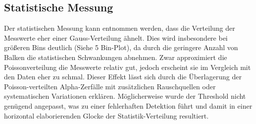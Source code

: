 \subsection{Statistische Messung}
Der statistischen Messung kann entnommen werden, dass die Verteilung der
Messwerte eher einer Gauss-Verteilung ähnelt. Dies wird insbesondere bei
größeren Bins deutlich (Siehe 5 Bin-Plot), da durch die geringere Anzahl 
von Balken die statistischen Schwankungen abnehmen. Zwar approximiert die 
Poissonverteilung die Messwerte relativ gut, jedoch erscheint sie im Vergleich 
mit den Daten eher zu schmal. Dieser Effekt lässt sich durch die Überlagerung
der Poisson-verteilten Alpha-Zerfälle mit zusätzlichen Rauschquellen oder
systematischen Variationen erklären. Möglicherweise wurde der Threshold nicht 
genügend angepasst, was zu einer fehlerhaften Detektion führt und damit in einer 
horizontal elaborierenden Glocke der Statistik-Verteilung resultiert.